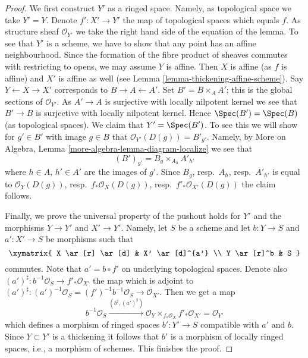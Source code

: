 \begin{proof}
We first construct $Y'$ as a ringed space. Namely, as topological
space we take $Y' = Y$. Denote $f' : X' \to Y'$ the map of topological
spaces which equals $f$. As structure sheaf $\mathcal{O}_{Y'}$ we take
the right hand side of the equation of the lemma. To see that
$Y'$ is a scheme, we have to show that any point has an affine
neighbourhood. Since the formation of the fibre product of sheaves
commutes with restricting to opens, we may assume $Y$ is affine.
Then $X$ is affine (as $f$ is affine) and $X'$ is affine as well
(see Lemma \ref{lemma-thickening-affine-scheme}).
Say $Y \leftarrow X \rightarrow X'$ corresponds
to $B \rightarrow A \leftarrow A'$. Set $B' = B \times_A A'$; this
is the global sections of $\mathcal{O}_{Y'}$. As $A' \to A$ is surjective
with locally nilpotent kernel we see that $B' \to B$ is surjective
with locally nilpotent kernel. Hence $\Spec(B') = \Spec(B)$ (as
topological spaces). We claim that $Y' = \Spec(B')$. To see this
we will show for $g' \in B'$ with image $g \in B$ that
$\mathcal{O}_{Y'}(D(g)) = B'_{g'}$. Namely, by
More on Algebra, Lemma \ref{more-algebra-lemma-diagram-localize} we see that
$$
(B')_{g'} = B_g \times_{A_h} A'_{h'}
$$
where $h \in A$, $h' \in A'$ are the images of $g'$. Since
$B_g$, resp.\ $A_h$, resp.\ $A'_{h'}$ is equal to $\mathcal{O}_Y(D(g))$,
resp.\ $f_*\mathcal{O}_X(D(g))$, resp.\ $f'_*\mathcal{O}_{X'}(D(g))$ the
claim follows.

\medskip\noindent
Finally, we prove the universal property of the pushout holds for
$Y'$ and the morphisms $Y \to Y'$ and $X' \to Y'$. Namely, let $S$ be
a scheme and let $b : Y \to S$ and $a' : X' \to S$ be morphisms such that
$$
\xymatrix{
X \ar[r] \ar[d]
&
X' \ar[d]^{a'}
\\
Y \ar[r]^b
&
S
}
$$
commutes. Note that $a' = b \circ f'$ on underlying topological spaces.
Denote also $(a')^\sharp : b^{-1}\mathcal{O}_S \to f'_*\mathcal{O}_{X'}$
the map which is adjoint to $(a')^\sharp :
(a')^{-1}\mathcal{O}_S = (f')^{-1} b^{-1}\mathcal{O}_S \to \mathcal{O}_{X'}$.
Then we get a map
$$
b^{-1}\mathcal{O}_S
\xrightarrow{(b^\sharp, (a')^\sharp)}
\mathcal{O}_Y \times_{f_*\mathcal{O}_X} f'_*\mathcal{O}_{X'}
=
\mathcal{O}_{Y'}
$$
which defines a morphism of ringed spaces $b' : Y' \to S$ compatible
with $a'$ and $b$. Since $Y \subset Y'$ is a thickening it follows that
$b'$ is a morphism of locally ringed spaces, i.e., a morphism of schemes.
This finishes the proof.
\end{proof}

